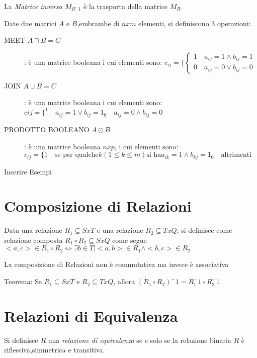 La \emph{Matrice inversa} $M_{R ^-1}$ è la trasporta della matrice $M_R$.

Date due matrici $A$ e $B$,embrambe di $n x m$ elementi, si definiscono 3 operazioni:
\begin{description}
    \item[MEET $A \sqcap B = C$]: è una matrice booleana i cui elementi sono:
$c_{ij} = \{ \begin{cases} 1 \quad a_{ij} = 1 \land b_{ij} = 1 \\ 0 \quad a_{ij} = 0 \lor b_{ij} = 0 \end{cases}$
    \item[JOIN $A \sqcup B = C$]: è una matrice booleana i cui elementi sono:
    $c{ij} = \{ ^ 1 \quad a_{ij} = 1 \lor b_{ij} = 1 _ 0 \quad a_{ij} = 0 \land b_{ij} = 0$
    \item[PRODOTTO BOOLEANO $A \odot B$]: è una matrice booleana $n x p$, i cui elementi sono:
    $c_{ij} = \{1 \quad \text{se per qualche} k(1 \leq k \leq m) \text{si ha} a_{ik} = 1 \land b_{kj} = 1
    _ 0 \quad \text{altrimenti}$
\end{description}

Inserire Esempi

\section{Composizione di Relazioni}
Data una relazione $R_1 \subseteq S x T$ e una relazione $R_2 \subseteq T x Q$,
si definisce come relazione composta $R_1 \circ R_2 \subseteq S x Q$ come segue
$<a,c> \in R_1 \circ R_2 \iff \exists b \in T | <a,b> \in R_1 \land <b,c> \in R_2$


La composizione di Relazioni non è commutativa ma invece è associativa

Teorema: Se $R_1 \subseteq S x T$ e $R_2 \subseteq T x Q$, allora $(R_1 \circ R_2)^-1 = R_1^-1 \circ R_2^-1$




\section{Relazioni di Equivalenza}
Si definisce $R$ una \emph{relazione di equivalenza} se e solo se la relazione binaria
$R$ è riflessiva,simmetrica e transitiva.

